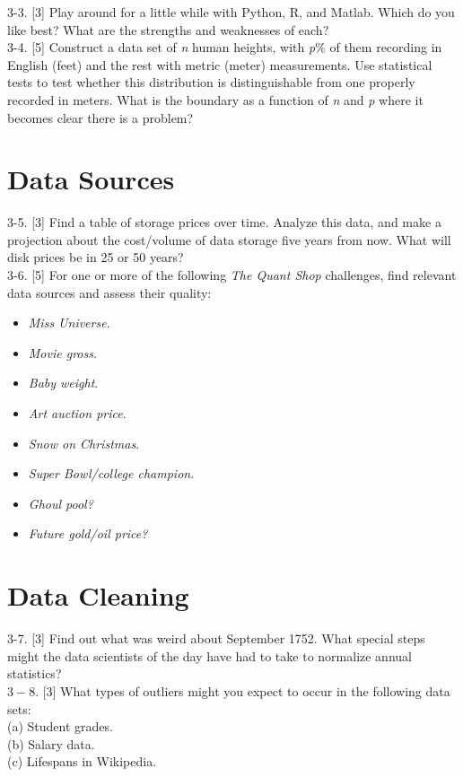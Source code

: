 \documentclass[10pt]{article}
\begin{document}
3-3. [3] Play around for a little while with Python, R, and Matlab. Which do you like best? What are the strengths and weaknesses of each?\\
3-4. [5] Construct a data set of \textit{n} human heights, with \textit{p}\% of them recording in English (feet) and the rest with metric (meter) measurements. Use statistical tests to test whether this distribution is distinguishable from one properly recorded in meters. What is the boundary as a function of \textit{n} and \textit{p} where it becomes clear there is a problem?

\section*{Data Sources}
3-5. [3] Find a table of storage prices over time. Analyze this data, and make a projection about the cost/volume of data storage five years from now. What will disk prices be in 25 or 50 years?\\
3-6. [5] For one or more of the following \textit{The Quant Shop} challenges, find relevant data sources and assess their quality:

\begin{itemize}
  \item \textit{Miss Universe}.
  \item \textit{Movie gross}.
  \item \textit{Baby weight}.
  \item \textit{Art auction price}.
  \item \textit{Snow on Christmas}.
  \item \textit{Super Bowl/college champion}.
  \item \textit{Ghoul pool?}
  \item \textit{Future gold/oil price?}
\end{itemize}

\section*{Data Cleaning}
3-7. [3] Find out what was weird about September 1752. What special steps might the data scientists of the day have had to take to normalize annual statistics?\\
$3-8$. [3] What types of outliers might you expect to occur in the following data sets:\\
(a) Student grades.\\
(b) Salary data.\\
(c) Lifespans in Wikipedia.
\end{document}
